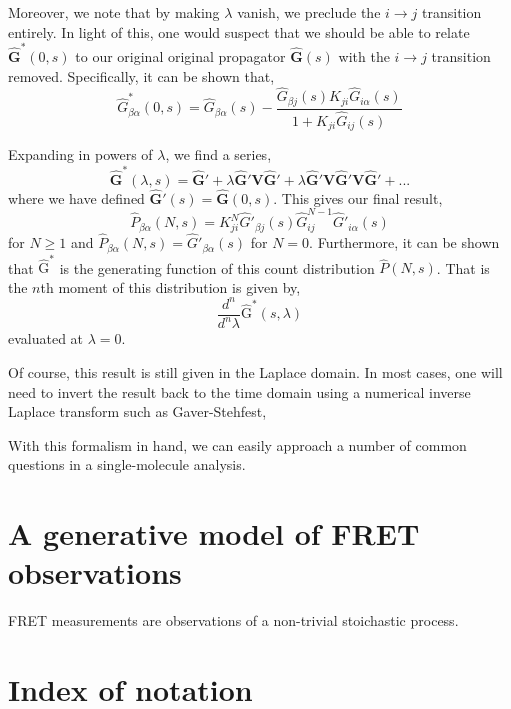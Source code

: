\documentclass{article}
\begin{document}
Moreover, we note that by making $\lambda$ vanish, we preclude the $i
\rightarrow j$ transition entirely. In light of this, one would suspect that we should
be able to relate $\mathbf{\hat G^*}(0, s)$ to our original original
propagator $\mathbf{\hat G}(s)$ with the $i \rightarrow j$ transition
removed. Specifically, it can be shown that,
\[ \hat G^*_{\beta\alpha}(0, s) = \hat G_{\beta\alpha}(s) -
\frac{\hat G_{\beta j}(s) K_{ji} \hat G_{i\alpha}(s)}{1 + K_{ji} \hat G_{ij}(s)}
\]

Expanding in powers of $\lambda$, we find a series,
\[ \mathbf{\hat G}^*(\lambda, s) = \mathbf{\hat G'}
  + \lambda \mathbf{\hat G'} \mathbf{V} \mathbf{\hat G'}
  + \lambda \mathbf{\hat G'} \mathbf{V} \mathbf{\hat G'} \mathbf{V} \mathbf{\hat G'}
  + ...
\]
where we have defined $\mathbf{\hat G'}(s) = \mathbf{\hat G}(0, s)$.
This gives our final result,
\[ \hat P_{\beta\alpha}(N,s) = K_{ji}^N \hat G'_{\beta j}(s) \hat G_{ij}^{N-1} \hat G'_{i\alpha}(s) \]
for $N \ge 1$ and $\hat P_{\beta\alpha}(N,s) = \hat
G'_{\beta\alpha}(s)$ for $N=0$. Furthermore, it can be shown that $\mathrm{\hat G^*}$ is the generating function of this count distribution $\hat P(N,s)$. That is the $n$th moment of this
distribution is given by,
\[ \frac{d^n}{d^n \lambda} \mathrm{\hat G^*}(s, \lambda) \]
evaluated at $\lambda = 0$.

Of course, this result is still given in the Laplace domain. In most
cases, one will need to invert the result back to the time domain
using a numerical inverse Laplace transform such as Gaver-Stehfest,



With this formalism in hand, we can easily approach a number of common
questions in a single-molecule analysis.


\section{A generative model of FRET observations}

FRET measurements are observations of a non-trivial stoichastic process.

\section{Index of notation}
\end{document}
